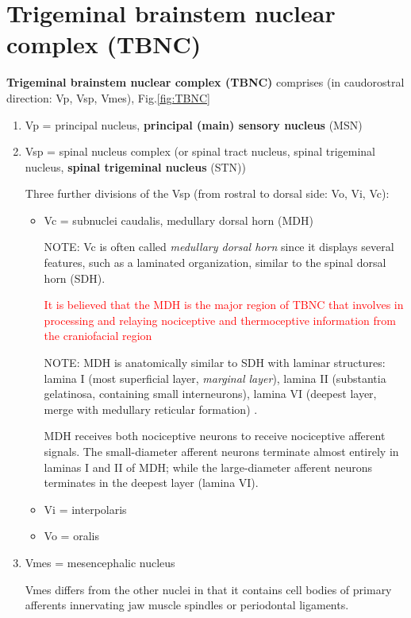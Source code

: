 \section{Trigeminal brainstem nuclear complex (TBNC)}
\label{sec:TBNC}

\def\Vsp{{V$_\text{sp}}} 

{\bf Trigeminal brainstem nuclear complex (TBNC)} comprises (in caudorostral
direction: Vp, Vsp, Vmes), Fig.\ref{fig:TBNC}
\begin{enumerate}
  \item Vp = principal nucleus, {\bf principal (main) sensory nucleus} (MSN)
  
  \item Vsp = spinal nucleus complex (or spinal tract nucleus, spinal trigeminal
  nucleus, {\bf spinal trigeminal nucleus} (STN))

Three further divisions of the Vsp (from rostral to dorsal side: Vo, Vi, Vc): 
\begin{itemize}
  \item Vc = subnuclei caudalis, medullary dorsal horn (MDH)
  
  NOTE: Vc is often called {\it medullary dorsal horn} since it displays several
  features, such as a laminated organization, similar to the spinal dorsal horn
  (SDH).

\textcolor{red}{It is believed that the MDH is the major region of TBNC that
involves in processing and relaying nociceptive and thermoceptive information
from the craniofacial region}
  
NOTE: MDH is anatomically similar to SDH with laminar structures:
lamina I (most superficial layer, {\it marginal layer}), lamina II (substantia
gelatinosa, containing small interneurons), lamina VI (deepest layer, merge with
medullary reticular formation) \citep{dubner1983}.
  
MDH receives both nociceptive neurons to receive nociceptive afferent signals.
The small-diameter afferent neurons terminate almost entirely in laminas I and
II of MDH; while the large-diameter afferent neurons terminates in the deepest
layer (lamina VI).
  
  \item Vi = interpolaris
  
  \item Vo = oralis 
\end{itemize}
  
  \item Vmes = mesencephalic nucleus
  
  Vmes differs from the other nuclei in that it contains cell bodies of primary
  afferents innervating jaw muscle spindles or periodontal ligaments.
\end{enumerate}




